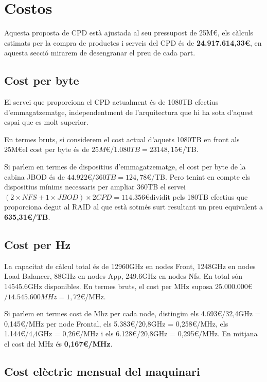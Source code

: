 \section{Costos}

Aquesta proposta de CPD està ajustada al seu pressupost de 25M\euro, els càlculs estimats per la compra de productes i serveis del CPD és de \textbf{24.917.614,33\euro}, en aquesta secció mirarem de desengranar el preu de cada part.

\subsection{Cost per byte}

El servei que proporciona el CPD actualment és de 1080TB efectius d'emmagatzematge, independentment de l'arquitectura que hi ha sota d'aquest espai que es molt superior.

En termes bruts, si considerem el cost actual d'aquets 1080TB en front als 25M\euro el cost per byte és de $25M$\euro$/1.080TB = 23148,15$\euro/TB.

Si parlem en termes de dispositius d'emmagatzematge, el cost per byte de la cabina JBOD és de $44.922$\euro$/360TB = 124,78$\euro/TB. Pero tenint en compte els dispositius mínims necessaris per ampliar 360TB el servei $(2 \times NFS + 1 \times JBOD) \times 2CPD = 114.356$\euro dividit pels 180TB efectius que proporciona degut al RAID al que està sotmés surt resultant un preu equivalent a \textbf{635,31\euro/TB}.

\subsection{Cost per Hz}

La capacitat de càlcul total és de 12960GHz en nodes Front, 1248GHz en nodes Load Balancer, 88GHz en nodes App,  249.6GHz en nodes Nfs. En total són 14545.6GHz disponibles. En termes bruts, el cost per MHz suposa $25.000.000$\euro$/14.545.600MHz = 1,72$\euro/MHz.

Si parlem en termes cost de Mhz per cada node, distingim els 4.693\euro/32,4GHz = 0,145\euro/MHz per node Frontal, els 5.383\euro/20,8GHz = 0,258\euro/MHz, els 1.144\euro/4,4GHz = 0,26\euro/MHz i els  6.128\euro/20,8GHz = 0,295\euro/MHz. En mitjana el cost del MHz és \textbf{0,167\euro/MHz}.

\subsection{Cost elèctric mensual del maquinari}

